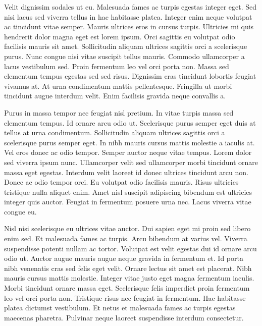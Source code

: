 \documentclass[11pt,a4paper]{article}
\begin{document}
Velit dignissim sodales ut eu. Malesuada fames ac turpis egestas integer eget. Sed nisi lacus sed viverra tellus in hac habitasse platea. Integer enim neque volutpat ac tincidunt vitae semper. Mauris ultrices eros in cursus turpis. Ultricies mi quis hendrerit dolor magna eget est lorem ipsum. Orci sagittis eu volutpat odio facilisis mauris sit amet. Sollicitudin aliquam ultrices sagittis orci a scelerisque purus. Nunc congue nisi vitae suscipit tellus mauris. Commodo ullamcorper a lacus vestibulum sed. Proin fermentum leo vel orci porta non. Massa sed elementum tempus egestas sed sed risus. Dignissim cras tincidunt lobortis feugiat vivamus at. At urna condimentum mattis pellentesque. Fringilla ut morbi tincidunt augue interdum velit. Enim facilisis gravida neque convallis a.

Purus in massa tempor nec feugiat nisl pretium. In vitae turpis massa sed elementum tempus. Id ornare arcu odio ut. Scelerisque purus semper eget duis at tellus at urna condimentum. Sollicitudin aliquam ultrices sagittis orci a scelerisque purus semper eget. In nibh mauris cursus mattis molestie a iaculis at. Vel eros donec ac odio tempor. Semper auctor neque vitae tempus. Lorem dolor sed viverra ipsum nunc. Ullamcorper velit sed ullamcorper morbi tincidunt ornare massa eget egestas. Interdum velit laoreet id donec ultrices tincidunt arcu non. Donec ac odio tempor orci. Eu volutpat odio facilisis mauris. Risus ultricies tristique nulla aliquet enim. Amet nisl suscipit adipiscing bibendum est ultricies integer quis auctor. Feugiat in fermentum posuere urna nec. Lacus viverra vitae congue eu.

Nisl nisi scelerisque eu ultrices vitae auctor. Dui sapien eget mi proin sed libero enim sed. Et malesuada fames ac turpis. Arcu bibendum at varius vel. Viverra suspendisse potenti nullam ac tortor. Volutpat est velit egestas dui id ornare arcu odio ut. Auctor augue mauris augue neque gravida in fermentum et. Id porta nibh venenatis cras sed felis eget velit. Ornare lectus sit amet est placerat. Nibh mauris cursus mattis molestie. Integer vitae justo eget magna fermentum iaculis. Morbi tincidunt ornare massa eget. Scelerisque felis imperdiet proin fermentum leo vel orci porta non. Tristique risus nec feugiat in fermentum. Hac habitasse platea dictumst vestibulum. Et netus et malesuada fames ac turpis egestas maecenas pharetra. Pulvinar neque laoreet suspendisse interdum consectetur.
\end{document}
